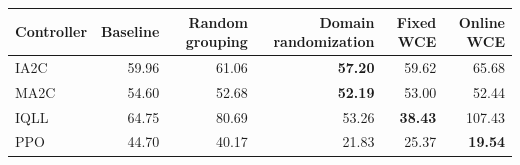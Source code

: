 \begin{tabular}{lrrrrr}
\hline
Controller & Baseline & Random grouping & Domain randomization & Fixed WCE & Online WCE \\
\hline
IA2C & 59.96 & 61.06 & \textbf{57.20} & 59.62 & 65.68 \\
MA2C & 54.60 & 52.68 & \textbf{52.19} & 53.00 & 52.44 \\
IQLL & 64.75 & 80.69 & 53.26 & \textbf{38.43} & 107.43 \\
PPO & 44.70 & 40.17 & 21.83 & 25.37 & \textbf{19.54} \\
\hline
\end{tabular}
